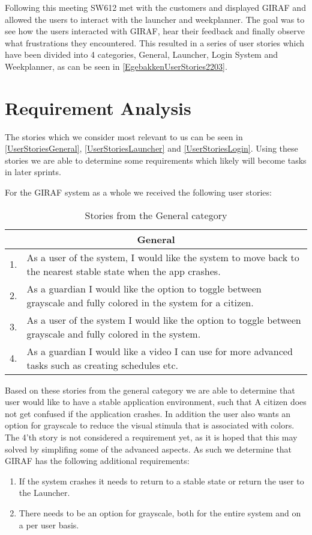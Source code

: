 Following this meeting SW612 met with the customers and displayed GIRAF and
allowed the users to interact with the launcher and weekplanner. The goal was to
see how the users interacted with GIRAF, hear their feedback and finally
observe what frustrations they encountered. This resulted in a series of user
stories which have been divided into 4 categories, General, Launcher, Login
System and Weekplanner, as can be seen in \autoref{EgebakkenUserStories2203}.

\section{Requirement Analysis}\label{S2:NewReqs}
The stories which we consider most relevant to us can be seen in
\autoref{UserStoriesGeneral}, \autoref{UserStoriesLauncher} and
\autoref{UserStoriesLogin}. Using these stories we are able to determine some
requirements which likely will become tasks in later sprints.\nl

For the GIRAF system as a whole we received the following user stories:
\begin{table}[H]
\begin{tabular}{|c|p{12.5cm}|}
\hline 
\multicolumn{2}{|c|}{General}\\\hline
1. & As a user of the system, I would like the system to move back to the
nearest stable state when the app crashes.\\\hline
2. & As a guardian I would like the option to toggle between grayscale and fully
colored in the system for a citizen. \\ \hline
3. & As a user of the system I would like the option to toggle between grayscale
and fully colored in the system. \\\hline
4. & As a guardian I would like a video I can use for more advanced tasks such
as creating schedules etc.\\\hline
\end{tabular}
\caption{Stories from the General category}
\label{UserStoriesGeneral}
\end{table}

Based on these stories from the general category we are able to determine that
user would like to have a stable application environment, such that A
citizen does not get confused if the application crashes. In addition the user
also wants an option for grayscale to reduce the visual stimula that is
associated with colors. The 4'th story is not considered a requirement yet, as
it is hoped that this may solved by simplifing some of the advanced aspects. As
such we determine that GIRAF has the following additional requirements:
\begin{enumerate}
  \item If the system crashes it needs to return to a stable state or return the
  user to the Launcher.
  \item There needs to be an option for grayscale, both for the entire system
  and on a per user basis.
\end{enumerate}

